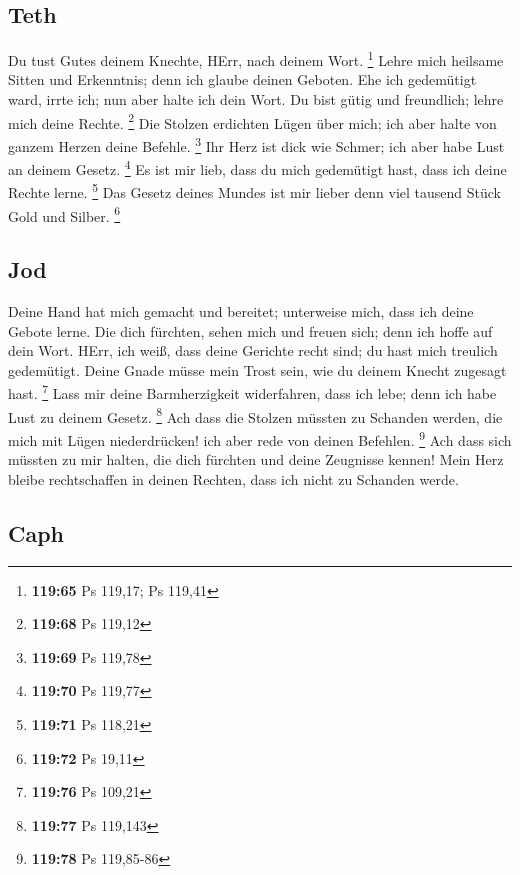 \hypertarget{teth}{%
\subsection{Teth}\label{teth}}

 Du tust Gutes deinem Knechte, HErr, nach deinem Wort.
\footnote{\textbf{119:65} Ps 119,17; Ps 119,41}  Lehre
mich heilsame Sitten und Erkenntnis; denn ich glaube deinen Geboten.
 Ehe ich gedemütigt ward, irrte ich; nun aber halte ich
dein Wort.  Du bist gütig und freundlich; lehre mich
deine Rechte. \footnote{\textbf{119:68} Ps 119,12}  Die
Stolzen erdichten Lügen über mich; ich aber halte von ganzem Herzen
deine Befehle. \footnote{\textbf{119:69} Ps 119,78}  Ihr
Herz ist dick wie Schmer; ich aber habe Lust an deinem Gesetz.
\footnote{\textbf{119:70} Ps 119,77}  Es ist mir lieb,
dass du mich gedemütigt hast, dass ich deine Rechte lerne. \footnote{\textbf{119:71}
  Ps 118,21}  Das Gesetz deines Mundes ist mir lieber
denn viel tausend Stück Gold und Silber. \footnote{\textbf{119:72} Ps
  19,11}

\hypertarget{jod}{%
\subsection{Jod}\label{jod}}

 Deine Hand hat mich gemacht und bereitet; unterweise
mich, dass ich deine Gebote lerne.  Die dich fürchten,
sehen mich und freuen sich; denn ich hoffe auf dein Wort.
 HErr, ich weiß, dass deine Gerichte recht sind; du hast
mich treulich gedemütigt.  Deine Gnade müsse mein Trost
sein, wie du deinem Knecht zugesagt hast. \footnote{\textbf{119:76} Ps
  109,21}  Lass mir deine Barmherzigkeit widerfahren,
dass ich lebe; denn ich habe Lust zu deinem Gesetz. \footnote{\textbf{119:77}
  Ps 119,143}  Ach dass die Stolzen müssten zu Schanden
werden, die mich mit Lügen niederdrücken! ich aber rede von deinen
Befehlen. \footnote{\textbf{119:78} Ps 119,85-86}  Ach
dass sich müssten zu mir halten, die dich fürchten und deine Zeugnisse
kennen!  Mein Herz bleibe rechtschaffen in deinen
Rechten, dass ich nicht zu Schanden werde.

\hypertarget{caph}{%
\subsection{Caph}\label{caph}}

